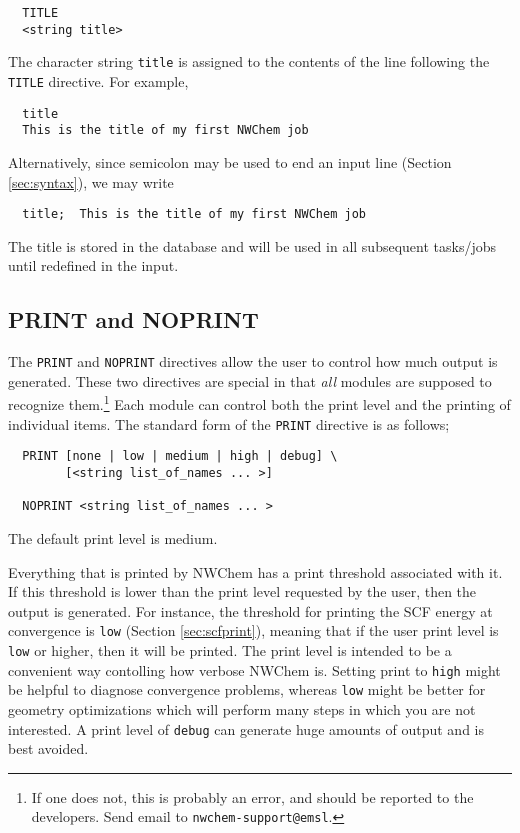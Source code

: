 \begin{verbatim}
  TITLE 
  <string title>
\end{verbatim}

The character string \verb+title+ is assigned to the contents of the
line following the \verb+TITLE+ directive.  For example,

\begin{verbatim}
  title
  This is the title of my first NWChem job
\end{verbatim}

Alternatively, since semicolon may be used to end an input line
(Section \ref{sec:syntax}), we may write

\begin{verbatim}
  title;  This is the title of my first NWChem job
\end{verbatim}

The title is stored in the database and will be used in all subsequent
tasks/jobs until redefined in the input.

\subsection{PRINT and NOPRINT}
\label{sec:printcontrol}

The \verb+PRINT+ and \verb+NOPRINT+ directives allow the user to
control how much output is generated.  These two directives are
special in that {\em all} modules are supposed to recognize
them.\footnote{If one does not, this is probably an error, and should
  be reported to the developers.  Send email to
  \verb+nwchem-support@emsl+.} Each module can control both the print
level and the printing of individual items.  The standard form of the
\verb+PRINT+ directive is as follows;

\begin{verbatim}
  PRINT [none | low | medium | high | debug] \
        [<string list_of_names ... >]

  NOPRINT <string list_of_names ... >
\end{verbatim}
The default print level is medium.

Everything that is printed by NWChem has a print threshold associated
with it. If this threshold is lower than the print level requested by
the user, then the output is generated.  For instance, the threshold
for printing the SCF energy at convergence is \verb+low+ (Section
\ref{sec:scfprint}), meaning that if the user print level is
\verb+low+ or higher, then it will be printed.  The print level is
intended to be a convenient way contolling how verbose NWChem is.
Setting print to \verb+high+ might be helpful to diagnose convergence
problems, whereas \verb+low+ might be better for geometry
optimizations which will perform many steps in which you are not
interested.  A print level of \verb+debug+ can generate huge amounts
of output and is best avoided.

